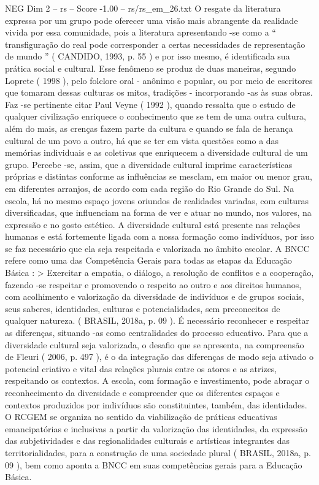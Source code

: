 \begin{textsample}{NEG Dim 2 – rs – Score -1.00 – rs/rs\_em\_26.txt}
O resgate da literatura expressa por um grupo pode oferecer uma visão mais abrangente da realidade vivida por essa comunidade, pois a literatura apresentando -se como a “ transfiguração do real pode corresponder a certas necessidades de representação de mundo ” ( CANDIDO, 1993, p. 55 ) e por isso mesmo, é identificada sua prática social e cultural.
Esse fenômeno se produz de duas maneiras, segundo Loprete ( 1998 ), pelo folclore oral - anônimo e popular, ou por meio de escritores que tomaram dessas culturas os mitos, tradições - incorporando -as às suas obras.
Faz -se pertinente citar Paul Veyne ( 1992 ), quando ressalta que o estudo de qualquer civilização enriquece o conhecimento que se tem de uma outra cultura, além do mais, as crenças fazem parte da cultura e quando se fala de herança cultural de um povo a outro, há que se ter em vista questões como a das memórias individuais e as coletivas que enriquecem a diversidade cultural de um grupo.
Percebe -se, assim, que a diversidade cultural imprime características próprias e distintas conforme as influências se mesclam, em maior ou menor grau, em diferentes arranjos, de acordo com cada região do Rio Grande do Sul.
Na escola, há no mesmo espaço jovens oriundos de realidades variadas, com culturas diversificadas, que influenciam na forma de ver e atuar no mundo, nos valores, na expressão e no gosto estético.
A diversidade cultural está presente nas relações humanas e está fortemente ligada com a nossa formação como indivíduos, por isso se faz necessário que ela seja respeitada e valorizada no âmbito escolar.
A BNCC refere como uma das Competência Gerais para todas as etapas da Educação Básica : > Exercitar a empatia, o diálogo, a resolução de conflitos e a cooperação, fazendo -se respeitar e promovendo o respeito ao outro e aos direitos humanos, com acolhimento e valorização da diversidade de indivíduos e de grupos sociais, seus saberes, identidades, culturas e potencialidades, sem preconceitos de qualquer natureza. ( BRASIL, 2018a, p. 09 ).
É necessário reconhecer e respeitar as diferenças, situando -as como centralidades do processo educativo.
Para que a diversidade cultural seja valorizada, o desafio que se apresenta, na compreensão de Fleuri ( 2006, p. 497 ), é o da integração das diferenças de modo seja ativado o potencial criativo e vital das relações plurais entre os atores e as atrizes, respeitando os contextos.
A escola, com formação e investimento, pode abraçar o reconhecimento da diversidade e compreender que os diferentes espaços e contextos produzidos por indivíduos são constituintes, também, das identidades.
O RCGEM se organiza no sentido da viabilização de práticas educativas emancipatórias e inclusivas a partir da valorização das identidades, da expressão das subjetividades e das regionalidades culturais e artísticas integrantes das territorialidades, para a construção de uma sociedade plural ( BRASIL, 2018a, p. 09 ), bem como aponta a BNCC em suas competências gerais para a Educação Básica.

\end{textsample}
